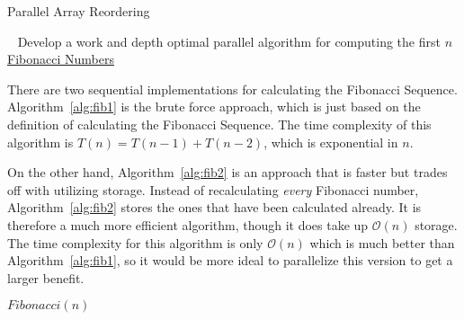 \documentclass[addpoints]{exam}
\newcommand{\BigO}[1]{\mathcal{O}\left( #1\right)}
\begin{document}
\begin{questions}
\begin{solution}
\begin{algorithm}[H]
\caption{Parallel Array Reordering}
\begin{algorithmic}[1]
    \ENDIF
\ENDFOR
{}
\ENDFOR
{}
\end{algorithmic}
\end{algorithm}
\end{solution}

\ \newpage
{}
Develop a work and depth optimal parallel algorithm for computing the first $n$ \href{https://en.wikipedia.org/wiki/Fibonacci_number}{Fibonacci Numbers}

\begin{solution}
There are two sequential implementations for calculating the Fibonacci Sequence. Algorithm~\ref{alg:fib1} is the brute force approach, which is just based on the definition of calculating the Fibonacci Sequence. The time complexity of this algorithm is $T(n) = T(n-1) + T(n-2)$, which is exponential in $n$.

On the other hand, Algorithm~\ref{alg:fib2} is an approach that is faster but trades off with utilizing storage. Instead of recalculating {\em every} Fibonacci number, Algorithm~\ref{alg:fib2} stores the ones that have been calculated already. It is therefore a much more efficient algorithm, though it does take up $\BigO{n}$ storage. The time complexity for this algorithm is only $\BigO{n}$ which is much better than Algorithm~\ref{alg:fib1}, so it would be more ideal to parallelize this version to get a larger benefit.

\begin{algorithm}[H]
\centering
\caption{$Fibonacci(n)$}
\begin{algorithmic}[1]
\ELSE
\ENDIF
\end{algorithmic}
\label{alg:fib1}
\end{algorithm}


\end{solution}
\end{questions}
\end{document}

